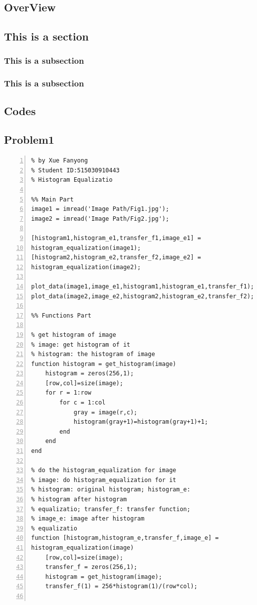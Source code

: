 \documentclass[11pt,oneside]{book}
\begin{document}
\section{OverView}


\section{This is a section}
\subsection{This is a subsection}
\subsection{This is a subsection}


\begin{appendices}
\chapter{Codes}
\section{Problem1}

\begin{lstlisting}[numbers=left, numberstyle=\tiny,keywordstyle=\color{blue!70},commentstyle=\color{red!50!green!50!blue!50},frame=shadowbox, rulesepcolor=\color{red!20!green!20!blue!20}] 
% Problem 1
% by Xue Fanyong
% Student ID:515030910443
% Histogram Equalizatio

%% Main Part
image1 = imread('Image Path/Fig1.jpg');
image2 = imread('Image Path/Fig2.jpg');

[histogram1,histogram_e1,transfer_f1,image_e1] = 
histogram_equalization(image1);
[histogram2,histogram_e2,transfer_f2,image_e2] = 
histogram_equalization(image2);

plot_data(image1,image_e1,histogram1,histogram_e1,transfer_f1);
plot_data(image2,image_e2,histogram2,histogram_e2,transfer_f2);

%% Functions Part

% get histogram of image
% image: get histogram of it
% histogram: the histogram of image
function histogram = get_histogram(image)
    histogram = zeros(256,1);
    [row,col]=size(image);
    for r = 1:row
        for c = 1:col
            gray = image(r,c);
            histogram(gray+1)=histogram(gray+1)+1;
        end
    end
end

% do the histogram_equalization for image
% image: do histogram_equalization for it
% histogram: original histogram; histogram_e: 
% histogram after histogram
% equalizatio; transfer_f: transfer function; 
% image_e: image after histogram
% equalizatio
function [histogram,histogram_e,transfer_f,image_e] = 
histogram_equalization(image)
    [row,col]=size(image);
    transfer_f = zeros(256,1);
    histogram = get_histogram(image);
    transfer_f(1) = 256*histogram(1)/(row*col);
    

\end{lstlisting}
\end{appendices}
\end{document}
